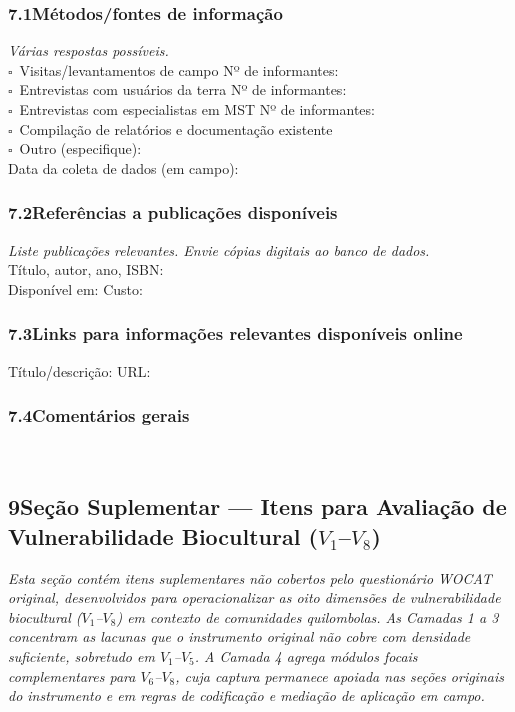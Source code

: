 \subsubsection*{7.1\quad Métodos/fontes de informação}
\textit{Várias respostas possíveis.}\\[4pt]
$\square$~Visitas/levantamentos de campo \quad Nº de informantes: \dotfill\\
$\square$~Entrevistas com usuários da terra \quad Nº de informantes: \dotfill\\
$\square$~Entrevistas com especialistas em MST \quad Nº de informantes: \dotfill\\
$\square$~Compilação de relatórios e documentação existente\\
$\square$~Outro (especifique): \dotfill\\[4pt]
Data da coleta de dados (em campo): \dotfill

\subsubsection*{7.2\quad Referências a publicações disponíveis}
\textit{Liste publicações relevantes. Envie cópias digitais ao banco de dados.}\\[4pt]
Título, autor, ano, ISBN: \dotfill\\
Disponível em: \dotfill\quad Custo: \dotfill

\subsubsection*{7.3\quad Links para informações relevantes disponíveis online}
Título/descrição: \dotfill\quad URL: \dotfill

\subsubsection*{7.4\quad Comentários gerais}
\dotfill\\[2pt]\dotfill

\subsection*{9\quad Seção Suplementar --- Itens para Avaliação de Vulnerabilidade Biocultural ($V_1$--$V_8$)}
\label{sec:suplementar}

\noindent\textit{Esta seção contém itens suplementares não cobertos pelo questionário WOCAT original, desenvolvidos para operacionalizar as oito dimensões de vulnerabilidade biocultural ($V_1$--$V_8$) em contexto de comunidades quilombolas. As Camadas 1 a 3 concentram as lacunas que o instrumento original não cobre com densidade suficiente, sobretudo em $V_1$--$V_5$. A Camada 4 agrega módulos focais complementares para $V_6$--$V_8$, cuja captura permanece apoiada nas seções originais do instrumento e em regras de codificação e mediação de aplicação em campo.}

